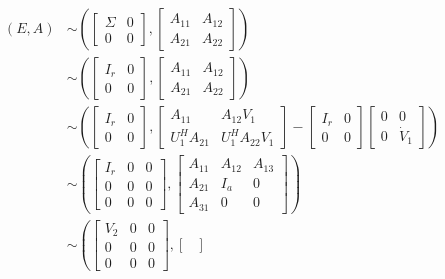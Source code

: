 \documentclass[]{book}
\theoremstyle{definition}
\theoremstyle{definition}
\theoremstyle{definition}
\theoremstyle{remark}
\begin{document}
\begin{align*}
(E,A) & 
\sim   
\left(\begin{bmatrix}
\Sigma & 0 \\
0 & 0
\end{bmatrix},
\begin{bmatrix}
A_{11} & A_{12} \\
A_{21} & A_{22}
\end{bmatrix}\right) \\
& \sim   
\left(\begin{bmatrix}
I_r & 0 \\
0 & 0
\end{bmatrix},
\begin{bmatrix}
A_{11} & A_{12} \\
A_{21} & A_{22}
\end{bmatrix}\right) \\
& \sim   
\left(\begin{bmatrix}
I_r & 0 \\
0 & 0
\end{bmatrix},
\begin{bmatrix}
A_{11} & A_{12}V_1 \\
U_1^HA_{21} & U_1^HA_{22}V_1 
\end{bmatrix}
-
\begin{bmatrix} I_r & 0 \\ 0 & 0 \end{bmatrix}
\begin{bmatrix} 0 & 0 \\ 0 & \dot V_1 \end{bmatrix}
\right) \\
& \sim   
\left(\begin{bmatrix}
I_r & 0 & 0 \\
0 & 0 & 0 \\
0 & 0 & 0
\end{bmatrix},
\begin{bmatrix}
A_{11} & A_{12} & A_{13}\\
A_{21} & I_a & 0 \\
A_{31} & 0  & 0
\end{bmatrix}\right) \\
& \sim   
\left(\begin{bmatrix}
V_2 & 0 & 0 \\
0 & 0 & 0 \\
0 & 0 & 0
\end{bmatrix},
\begin{bmatrix}

\end{bmatrix}
\end{align*}
\end{document}
